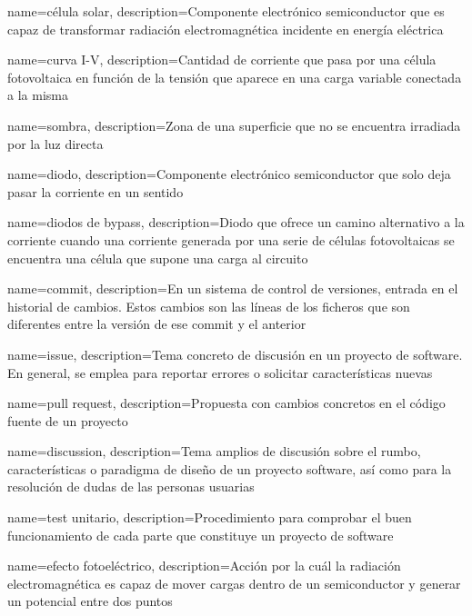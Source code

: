 {
    name={célula solar},
    description={Componente electrónico \gls{semiconductor} que es capaz de transformar radiación electromagnética incidente en energía eléctrica}
}

{
    name={curva I-V},
    description={Cantidad de corriente que pasa por una célula fotovoltaica en función de la tensión que aparece en una \gls{carga} variable conectada a la misma}
}

{
    name={sombra},
    description={Zona de una superficie que no se encuentra irradiada por la luz \gls{directa}}
}

{
    name={diodo},
    description={Componente electrónico \gls{semiconductor} que solo deja pasar la corriente en un sentido}
}

{
    name={diodos de bypass},
    description={Diodo que ofrece un camino alternativo a la corriente cuando una corriente generada por una serie de células fotovoltaicas se encuentra una célula que supone una \gls{carga} al circuito}
}

{
    name={commit},
    description={En un sistema de control de versiones, entrada en el historial de cambios. Estos cambios son las líneas de los ficheros que son diferentes entre la versión de ese commit y el anterior}
}

{
    name={issue},
    description={Tema concreto de discusión en un proyecto de \gls{software}. En general, se emplea para reportar errores o solicitar características nuevas}
}

{
    name={pull request},
    description={Propuesta con cambios concretos en el código fuente de un proyecto}
}

{
    name={discussion},
    description={Tema amplios de discusión sobre el rumbo, características o paradigma de diseño de un proyecto \gls{software}, así como para la resolución de dudas de las personas usuarias}
}

{
    name={test unitario},
    description={Procedimiento para comprobar el buen funcionamiento de cada parte que constituye un proyecto de \gls{software}}
}

{
    name={efecto fotoeléctrico},
    description={Acción por la cuál la radiación electromagnética es capaz de mover cargas dentro de un \gls{semiconductor} y generar un potencial entre dos puntos}
}

